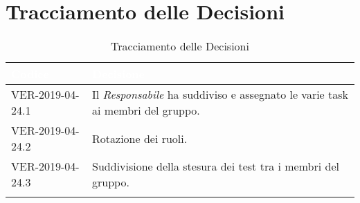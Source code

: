\newpage
\section{Tracciamento delle Decisioni}

\begin{longtable}{|C{.40\textwidth}|C{.60\textwidth}|}
\hline
{}\textbf{\textcolor{white}{Codice}} & \textbf{\textcolor{white}{Decisione}}\\
\hline
VER-2019-04-24.1 & Il \textit{Responsabile} ha suddiviso e assegnato le varie task ai membri del gruppo. \\
\hline
{}VER-2019-04-24.2 & Rotazione dei ruoli. \\
\hline
VER-2019-04-24.3 & Suddivisione della stesura dei test tra i membri del gruppo. \\
\hline

\caption{Tracciamento delle Decisioni}
\end{longtable}
